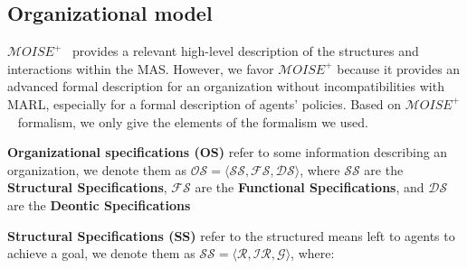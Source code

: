 \documentclass[runningheads]{llncs}
\theoremstyle{freethm}
\theoremstyle{proofoutline}
\begin{document}
\subsection{Organizational model}

$\mathcal{M}OISE^+$~\cite{Hubner2007} provides a relevant high-level description of the structures and interactions within the MAS. However, we favor $\mathcal{M}OISE^+$ because it provides an advanced formal description for an organization without incompatibilities with MARL, especially for a formal description of agents' policies.
Based on $\mathcal{M}OISE^+$~\cite{Hubner2007} formalism, we only give the elements of the formalism we used.

\textbf{Organizational specifications (OS)} refer to some information describing an organization, we denote them as $\mathcal{OS} = \langle \mathcal{SS}, \mathcal{FS}, \mathcal{DS} \rangle$, where $\mathcal{SS}$ are the \textbf{Structural Specifications}, $\mathcal{FS}$ are the \textbf{Functional Specifications}, and $\mathcal{DS}$ are the \textbf{Deontic Specifications}

\textbf{Structural Specifications (SS)} refer to the structured means left to agents to achieve a goal, we denote them as $\mathcal{SS} = \langle \mathcal{R}, \mathcal{IR}, \mathcal{G} \rangle$, where:
\end{document}
